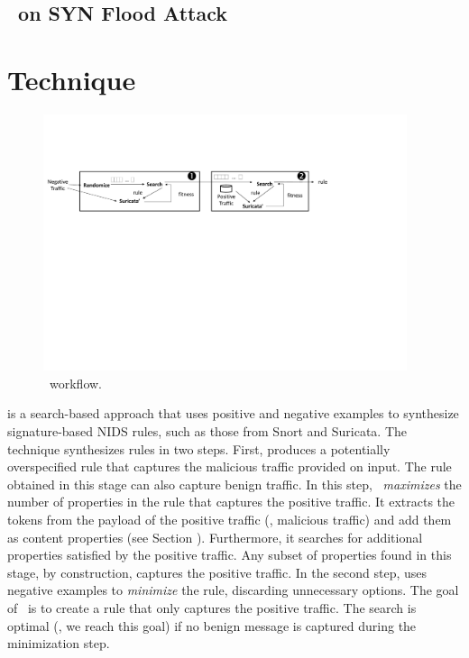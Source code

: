 \documentclass[runningheads]{llncs}
\begin{document}

\subsection{\tname\ on SYN Flood Attack}

  

\section{Technique}

\begin{figure}[t]
\centering
\includegraphics[trim=10 360 182 130,clip,width=0.95\textwidth]{figs/nids-workflow}
\caption{\tname\ workflow.}
\label{fig:overview}
\end{figure}

\tname{} is a search-based approach that uses positive and negative
examples to synthesize signature-based NIDS rules, such as those from
Snort and Suricata. The technique synthesizes rules in two
steps. First, \tname{} produces a potentially overspecified rule that
captures the malicious traffic provided on input. The rule obtained in
this stage can also capture benign traffic. In this step,
\tname\ \emph{maximizes} the number of properties in the rule that
captures the positive traffic. It extracts the tokens from the payload
of the positive traffic (\ie{}, malicious traffic) and add them as
content properties (see Section ). Furthermore, it searches
for additional properties satisfied by the positive traffic. Any
subset of properties found in this stage, by construction, captures
the positive traffic. In the second step, \tname{} uses negative
examples to \emph{minimize} the rule, discarding unnecessary
options. The goal of \tname\ is to create a rule that only captures
the positive traffic. The search is optimal (\ie{}, we reach this
goal) if no benign message is captured during the minimization step.
\end{document}
